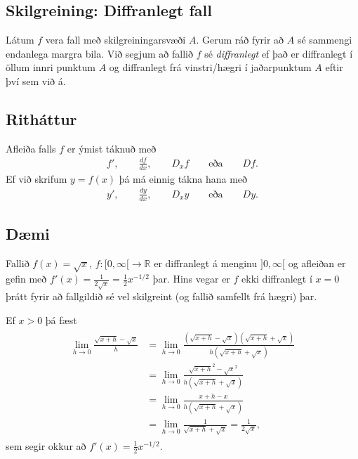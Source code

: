 \documentclass[a4paper,10pt,icelandic]{sphinxmanual}
\begin{document}

\subsection{Skilgreining: Diffranlegt fall}
\label{kafli03:skilgreining-diffranlegt-fall}\label{kafli03:index-3}
Látum \(f\) vera fall með skilgreiningarsvæði \(A\). Gerum ráð
fyrir að \(A\) sé sammengi endanlega margra bila. Við segjum að
fallið \(f\) sé \emph{diffranlegt} ef það er diffranlegt í öllum innri
punktum \(A\) og diffranlegt frá vinstri/hægri í jaðarpunktum
\(A\) eftir því sem við á.


\subsection{Ritháttur}
\label{kafli03:rithattur}
Afleiða falls \(f\) er ýmist táknuð með
\begin{equation*}
\begin{split}f', \qquad \frac {df}{dx}, \qquad D_x f \qquad \text{eða} \qquad Df.\end{split}
\end{equation*}
Ef við skrifum \(y=f(x)\) þá má einnig tákna hana með
\begin{equation*}
\begin{split}y', \qquad \frac {dy}{dx}, \qquad D_x y \qquad \text{eða} \qquad Dy.\end{split}
\end{equation*}

\subsection{Dæmi}
\label{kafli03:id3}
Fallið \(f(x) = \sqrt{x}\), \(f:[0,\infty[\to {{\mathbb  R}}\)
er diffranlegt á menginu \(]0,\infty[\) og afleiðan er gefin með
\(f'(x) = \frac 1{2\sqrt{x}} = \frac 12 x^{-1/2}\) þar. Hins vegar
er \(f\) ekki diffranlegt í \(x=0\) þrátt fyrir að fallgildið sé
vel skilgreint (og fallið samfellt frá hægri) þar.

Ef \(x>0\) þá fæst
\begin{equation*}
\begin{split}\begin{aligned}
  \lim_{h\to 0} \frac{\sqrt{x+h}-\sqrt{x}}h &=
  \lim_{h\to 0} \frac{(\sqrt{x+h}-\sqrt{x})(\sqrt{x+h}+\sqrt{x})}{h(\sqrt{x+h}+\sqrt{x})}\\
  &= \lim_{h\to 0} \frac{\sqrt{x+h}^2-\sqrt{x}^2}{h(\sqrt{x+h}+\sqrt{x})}\\
  &= \lim_{h\to 0} \frac{x+h-x}{h(\sqrt{x+h}+\sqrt{x})}\\
  &= \lim_{h\to 0} \frac{1}{\sqrt{x+h}+\sqrt{x}} = \frac{1}{2\sqrt{x}},\end{aligned}\end{split}
\end{equation*}
sem segir okkur að \(f'(x) = \frac 12 x^{-1/2}\).
\end{document}
